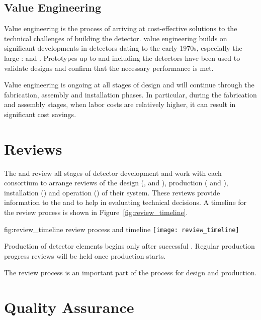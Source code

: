 \subsection{Value Engineering}
\label{sec:es-tc-fdsp-coord-ve}

Value engineering is the process of arriving at cost-effective
solutions to the technical challenges of building the 
detector.  value engineering builds on significant
developments in  detectors dating to the early 1970s,
especially the large :  and
. Prototypes up to and including the  
detectors have been used to validate
 designs and confirm that the necessary performance is
met. 

Value engineering is ongoing at all stages of design and will continue
through the fabrication, assembly and installation phases. In
particular, during the fabrication and assembly stages, when labor costs
are relatively higher, it can result in significant cost savings. 

\section{Reviews}
\label{sec:es-tc-reviews}


The  and  review all stages of detector development
and work with each consortium to arrange reviews of the design
(,  and ), production (
and ), installation () and operation
() of their system.  These reviews provide information to
the  and  to help in evaluating technical
decisions. A timeline for the review process is shown in
Figure~\ref{fig:review_timeline}.
\begin{dunefigure}{fig:review_timeline}
  { review process and timeline}
  \texttt{[image: review\_timeline]}
\end{dunefigure}

Production of detector elements begins only after successful
. Regular production progress reviews will be held once
production starts. 

The review process is an important part of the  
process for design and production.

\section{Quality Assurance}
\label{sec:es-tc-qa}

